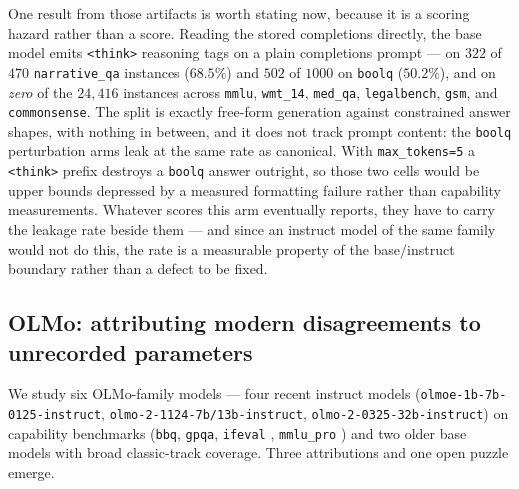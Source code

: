 One result from those artifacts is worth stating now, because it is a scoring
hazard rather than a score. Reading the stored completions directly, the base
model emits \texttt{<think>} reasoning tags on a plain completions prompt --- on
$322$ of $470$ \texttt{narrative\_qa} instances ($68.5\%$) and $502$ of $1000$ on
\texttt{boolq} ($50.2\%$), and on \emph{zero} of the $24{,}416$ instances across
\texttt{mmlu}, \texttt{wmt\_14}, \texttt{med\_qa}, \texttt{legalbench},
\texttt{gsm}, and \texttt{commonsense}. The split is exactly free-form generation
against constrained answer shapes, with nothing in between, and it does not track
prompt content: the \texttt{boolq} perturbation arms leak at the same rate as
canonical. With \texttt{max\_tokens=5} a \texttt{<think>} prefix destroys a
\texttt{boolq} answer outright, so those two cells would be upper bounds depressed
by a measured formatting failure rather than capability measurements. Whatever
scores this arm eventually reports, they have to carry the leakage rate beside
them --- and since an instruct model of the same family would not do this, the
rate is a measurable property of the base/instruct boundary rather than a defect
to be fixed.
\par\smallskip\noindent{}\par\smallskip

\subsection{OLMo: attributing modern disagreements to unrecorded parameters}
\label{sec:olmo}

We study six OLMo-family models
\citep{groeneveld2024olmo,olmo2_2024,muennighoff2024olmoe} --- four recent instruct models
(\texttt{olmoe-1b-7b-0125-instruct}, \texttt{olmo-2-1124-7b/13b-instruct},
\texttt{olmo-2-0325-32b-instruct}) on capability benchmarks
(\texttt{bbq}, \texttt{gpqa}, \texttt{ifeval} \citep{zhou2023ifeval},
\texttt{mmlu\_pro} \citep{hendrycks2021mmlu}) and two older base
models with broad classic-track coverage. Three attributions and one open puzzle
emerge.

